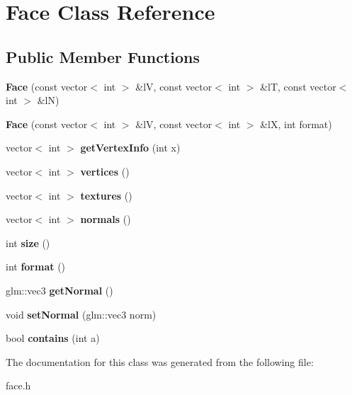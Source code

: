 \hypertarget{classFace}{\section{Face Class Reference}
\label{classFace}
}
\subsection*{Public Member Functions}
\begin{DoxyCompactItemize}
\item 
\hypertarget{classFace_a5e8fd69ba079f4026bfd316cf68bbbe8}{{\bfseries Face} (const vector$<$ int $>$ \&l\-V, const vector$<$ int $>$ \&l\-T, const vector$<$ int $>$ \&l\-N)}\label{classFace_a5e8fd69ba079f4026bfd316cf68bbbe8}

\item 
\hypertarget{classFace_a2088bea0903365fd46b91759be66adae}{{\bfseries Face} (const vector$<$ int $>$ \&l\-V, const vector$<$ int $>$ \&l\-X, int format)}\label{classFace_a2088bea0903365fd46b91759be66adae}

\item 
\hypertarget{classFace_a52c013b769e7eb6d019e34436924ca5d}{vector$<$ int $>$ {\bfseries get\-Vertex\-Info} (int x)}\label{classFace_a52c013b769e7eb6d019e34436924ca5d}

\item 
\hypertarget{classFace_a4ecf673236db14d13e87f4dc2d9bfdbe}{vector$<$ int $>$ {\bfseries vertices} ()}\label{classFace_a4ecf673236db14d13e87f4dc2d9bfdbe}

\item 
\hypertarget{classFace_ace0da57ceb3a70c5c04f21b7762f8bbc}{vector$<$ int $>$ {\bfseries textures} ()}\label{classFace_ace0da57ceb3a70c5c04f21b7762f8bbc}

\item 
\hypertarget{classFace_a9c2e0b7414d109754dbb80c49d8f8001}{vector$<$ int $>$ {\bfseries normals} ()}\label{classFace_a9c2e0b7414d109754dbb80c49d8f8001}

\item 
\hypertarget{classFace_a9414ee671da3c8566a00b489315aa8f6}{int {\bfseries size} ()}\label{classFace_a9414ee671da3c8566a00b489315aa8f6}

\item 
\hypertarget{classFace_a589ea1374ce303ac726a411b06561429}{int {\bfseries format} ()}\label{classFace_a589ea1374ce303ac726a411b06561429}

\item 
\hypertarget{classFace_a28f41b02ea135a764f7b3974db9ade07}{glm\-::vec3 {\bfseries get\-Normal} ()}\label{classFace_a28f41b02ea135a764f7b3974db9ade07}

\item 
\hypertarget{classFace_a17d4600346b5585672ad0bea15846b6e}{void {\bfseries set\-Normal} (glm\-::vec3 norm)}\label{classFace_a17d4600346b5585672ad0bea15846b6e}

\item 
\hypertarget{classFace_a367b3c98f08910daa2b6bdf6f9f12ef0}{bool {\bfseries contains} (int a)}\label{classFace_a367b3c98f08910daa2b6bdf6f9f12ef0}

\end{DoxyCompactItemize}


The documentation for this class was generated from the following file\-:\begin{DoxyCompactItemize}
\item 
face.\-h\end{DoxyCompactItemize}
